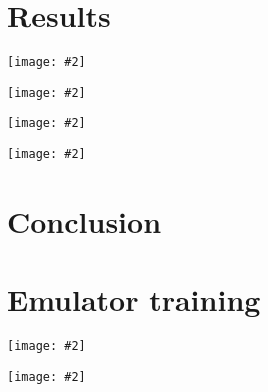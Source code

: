 \documentclass[aps, prc, reprint, amsmath]{revtex4-1}
\newcommand{\widefig}[3][t]{
  \begin{figure*}[#1]
    \texttt{[image: \#2]}
    \caption{\label{fig:#2}#3}
  \end{figure*}
}
\begin{document}
\section{Results}

\cite{alice-cumulants}
\cite{osu1, osu2}

\widefig{calibration_posterior_glb}{
  Posterior marginal and joint distributions of the calibration parameters for the Glauber model.
  On the diagonal are histograms of MCMC samples for the respective parameters,
  on the lower triangle are two-dimensional histograms of MCMC samples showing the correlation between pairs of parameters.
  The upper triangle is blank for now. \textbf{FIXME}
}

\widefig{calibration_posterior_kln}{
  Same as FIG.~\ref{fig:calibration_posterior_glb} for the KLN model.
}

\widefig{posterior_draws_glb}{
  Random realizations of the calibrated posterior for the Glauber model.
  Similar to FIG.~\ref{fig:prior_draws_glb},
  except the lines are posterior emulator predictions instead of explicit prior calculations.
  The red line is the maximum a posteriori point of the MCMC chain.
}

\widefig{posterior_draws_kln}{
  Same as FIG.~\ref{fig:posterior_draws_glb} for the KLN model.
}



\section{Conclusion}



\appendix


\section{Emulator training}

\widefig{training_posterior_glb}{
  Posterior marginal and joint distributions of the Gaussian process hyperparameters for the first Glauber principal component.
  The notation $\ell\;x$ means the squared-exponential correlation length for parameter $x$. \textbf{IMPROVE THIS}
  On the diagonal are histograms of MCMC samples for the respective hyperparameters,
  on the lower triangle are two-dimensional histograms of MCMC samples showing the correlation between pairs of hyperparameters.
  The upper triangle is blank for now. \textbf{FIXME}
}

\widefig{training_posterior_kln}{
  Same as FIG.~\ref{fig:training_posterior_glb} for the KLN model.
}




\end{document}
